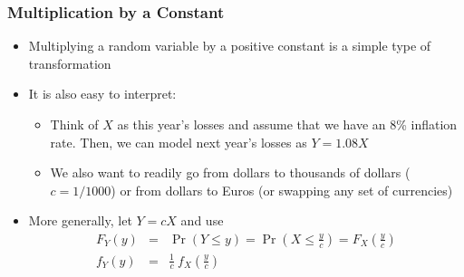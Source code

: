 \documentclass{beamer}
\begin{document}
\begin{frame}
\frametitle{Multiplication by a Constant}
\begin{itemize}
\item Multiplying a random variable by a positive constant is a simple type of
transformation \vspace{2mm}

\item It is also easy to interpret: \vspace{2mm}

\begin{itemize}
\item Think of $X$ as this year's losses and assume that we have an 8\% inflation rate. Then, we can model next year's losses as $Y =
1.08X$ \vspace{2mm}

\item We also want to readily go from dollars to thousands of dollars ($c=1/1000$) or from dollars to Euros (or swapping any set of
currencies) \vspace{2mm}

\end{itemize}
\item More generally, let $Y=cX$ and use
\begin{eqnarray*}
F_Y (y) &=& \Pr( Y \le y) = \Pr \left(X \le \frac{y}{c}\right)= F_X \left(\frac{y}{c}\right)\\
f_Y (y) &=& \frac{1}{c}~f_X\left(\frac{y}{c}\right)
\end{eqnarray*}
\end{itemize}
\end{frame}
\end{document}

